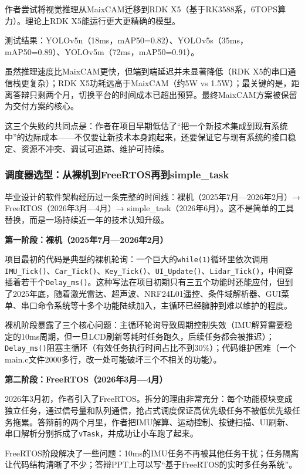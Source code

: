 作者尝试将视觉推理从MaixCAM迁移到RDK X5（基于RK3588系，6TOPS算力）。理论上RDK X5能运行更大更精确的模型。

测试结果：YOLOv5n（18ms，mAP50=0.82）、YOLOv5s（35ms，mAP50=0.89）、YOLOv5m（72ms，mAP50=0.91）。

虽然推理速度比MaixCAM更快，但端到端延迟并未显著降低（RDK X5的串口通信栈更复杂）；RDK X5功耗远高于MaixCAM（约5W vs 1.5W）；最关键的是，距离答辩只剩两个月，切换平台的时间成本已超出预算。最终MaixCAM方案被保留为交付方案的核心。

这三个失败的共同点是：作者在项目早期低估了“把一个新技术集成到现有系统中”的边际成本——不仅要让新技术本身跑起来，还要保证它与现有系统的接口稳定、资源不冲突、调试可追踪、维护可持续。

\subsubsection{调度器选型：从裸机到FreeRTOS再到simple\_task}

毕业设计的软件架构经历过一条完整的时间线：裸机（2025年7月—2026年2月）→ FreeRTOS（2026年3月—4月）→ simple\_task（2026年6月）。这不是简单的工具替换，而是一场持续近一年的技术认知升级。

\textbf{第一阶段：裸机（2025年7月—2026年2月）}

项目最初的代码是典型的裸机轮询：一个巨大的\texttt{while(1)}循环里依次调用\texttt{IMU\_Tick()}、\texttt{Car\_Tick()}、\texttt{Key\_Tick()}、\texttt{UI\_Update()}、\texttt{Lidar\_Tick()}，中间穿插着若干个\texttt{Delay\_ms()}。这种写法在项目初期只有三五个功能时还能应付，但到了2025年底，随着激光雷达、超声波、NRF24L01遥控、条件域解析器、GUI菜单、串口命令系统等十多个功能陆续加入，主循环已经臃肿到难以维护的程度。

裸机阶段暴露了三个核心问题：主循环轮询导致周期控制失效（IMU解算需要稳定的10ms周期，但一旦LCD刷新等耗时任务跑久，后续任务都会被推迟）；\texttt{Delay\_ms()}阻塞主循环（有效任务执行时间占比不到30\%）；代码维护困难（一个main.c文件2000多行，改一处可能破坏三个不相关的功能）。

\textbf{第二阶段：FreeRTOS（2026年3月—4月）}

2026年3月初，作者引入了FreeRTOS。拆分的理由非常充分：每个功能模块变成独立任务，通过信号量和队列通信，抢占式调度保证高优先级任务不被低优先级任务拖累。答辩前的两个月里，作者把IMU解算、运动控制、按键扫描、UI刷新、串口解析分别拆成了\texttt{vTask}，并成功让小车跑了起来。

FreeRTOS阶段解决了一些问题：10ms的IMU任务不再被其他任务干扰；任务隔离让代码结构清晰了不少；答辩PPT上可以写“基于FreeRTOS的实时多任务系统”。

